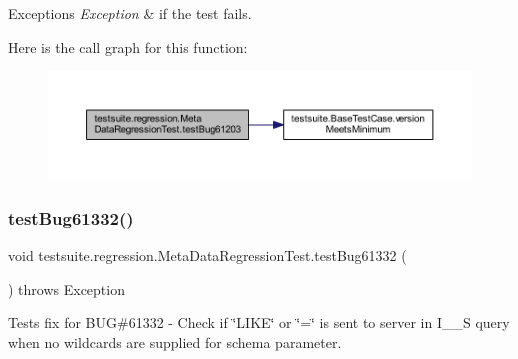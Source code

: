 \begin{DoxyExceptions}{Exceptions}
{\em Exception} & if the test fails. \\
\hline
\end{DoxyExceptions}
Here is the call graph for this function\+:
\nopagebreak
\begin{figure}[H]
\begin{center}
\leavevmode
\includegraphics[width=350pt]{classtestsuite_1_1regression_1_1_meta_data_regression_test_a0dd9e6de4ad836964f235a4a27aed144_cgraph}
\end{center}
\end{figure}
\mbox{\label{classtestsuite_1_1regression_1_1_meta_data_regression_test_aaf434af6a2a4b3cc948e8973837c8cca}} 
\subsubsection{\texorpdfstring{test\+Bug61332()}{testBug61332()}}
{\footnotesize\ttfamily void testsuite.\+regression.\+Meta\+Data\+Regression\+Test.\+test\+Bug61332 (\begin{DoxyParamCaption}{ }\end{DoxyParamCaption}) throws Exception}

Tests fix for B\+UG\#61332 -\/ Check if \char`\"{}\+L\+I\+K\+E\char`\"{} or \char`\"{}=\char`\"{} is sent to server in I\+\_\+\+\_\+S query when no wildcards are supplied for schema parameter.


